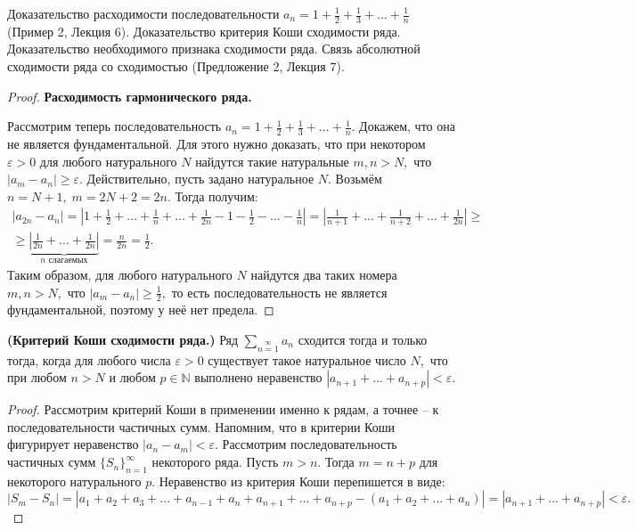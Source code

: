 \newpage
\begin{problem}
Доказательство расходимости последовательности $a_n = 1 + \frac{1}{2} + \frac{1}{3} + \dots + \frac{1}{n}$ (Пример 2, Лекция 6). Доказательство критерия Коши сходимости ряда. Доказательство необходимого признака сходимости ряда. Связь абсолютной сходимости ряда со сходимостью  (Предложение 2, Лекция 7).
\end{problem}

\begin{proof} \textbf{Расходимость гармонического ряда.}

    Рассмотрим теперь последовательность
    $a_n=1+\frac{1}{2}+\frac{1}{3}+...+\frac{1}{n}.$
    Докажем, что она не является фундаментальной.
    Для этого нужно доказать, что
    при некотором $\varepsilon>0$ для любого
    натурального $N$ найдутся такие натуральные
    $m, n>N,$ что $|a_m-a_n|\geq\varepsilon.$
    Действительно, пусть задано натуральное
    $N.$ Возьмём $n=N+1,\;m=2N+2=2n.$ Тогда
    получим:
    \begin{multline*}
        |a_{2n}-a_n|=\left|1+\frac{1}{2}+...+\frac{1}{n}+
        ...+\frac{1}{2n}-1-\frac{1}{2}-...-\frac{1}{n}\right|
        =\left|\frac{1}{n+1}+...+\frac{1}{n+2}+
        ...+\frac{1}{2n}\right|\geq\\
        \geq\underbrace{\left|\frac{1}{2n}+...+\frac{1}{2n}\right|}
        \limits_{n \textrm{ слагаемых}}
        =\frac{n}{2n}=\frac{1}{2}.
    \end{multline*}
    Таким образом, для любого натурального $N$
    найдутся два таких номера $m, n>N,$
    что $|a_m-a_n|\geq\frac{1}{2},$ то есть
    последовательность не является фундаментальной,
    поэтому у неё нет предела.
\end{proof}

\begin{theorem} \textbf{(Критерий Коши сходимости ряда.)}
    Ряд $\sum\limits_{n=1}\limits^{\infty}a_n$ сходится тогда
    и только тогда, когда для любого числа $\varepsilon>0$
    существует такое натуральное число $N,$ что
    при любом $n>N$ и любом $p\in\mathbb{N}$
    выполнено неравенство $|a_{n+1}+...+a_{n+p}|<\varepsilon.$
\end{theorem}

\begin{proof}

    Рассмотрим критерий Коши в применении именно к рядам,
    а точнее -- к последовательности частичных сумм.
    Напомним, что в критерии Коши фигурирует
    неравенство $|a_n-a_m|<\varepsilon$. Рассмотрим
    последовательность частичных сумм
    $\{S_n\}_{n=1}^{\infty}$ некоторого ряда.
    Пусть $m>n.$ Тогда $m=n+p$ для некоторого
    натурального $p.$  Неравенство из критерия
    Коши перепишется в виде:
    $$
        |S_m-S_n|=|a_1+a_2+a_3+...+a_{n-1}+a_{n}+a_{n+1}+...+a_{n+p}-
        (a_1+a_2+...+a_n)|=|a_{n+1}+...+a_{n+p}|<\varepsilon.
    $$
\end{proof}

